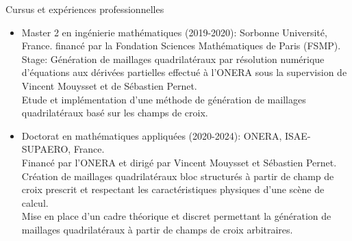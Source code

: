 \documentclass[compress,10pt,aspectratio=169]{beamer}
\begin{document}
\begin{frame}{Cursus et expériences professionnelles}
\small
\vspace{-0.2cm}
\begin{itemize}
\item {\color{onera} Master 2 en ingénierie mathématiques (2019-2020):} Sorbonne Université, France. financé par la Fondation Sciences Mathématiques de Paris (FSMP).\\
Stage: Génération de maillages quadrilatéraux par résolution numérique d’équations aux dérivées partielles effectué à l'ONERA sous la supervision de Vincent Mouysset et de Sébastien Pernet.\\
{\color{onera_gray} Etude et implémentation d'une méthode de génération de maillages quadrilatéraux basé sur les champs de croix.}\\\vspace{0.6cm}

\item {\color{onera} Doctorat en mathématiques appliquées (2020-2024):} ONERA, ISAE-SUPAERO, France.\\
Financé par l'ONERA et dirigé par Vincent Mouysset et Sébastien Pernet. \\
Création de maillages quadrilatéraux bloc structurés à partir de champ de croix prescrit et respectant les caractéristiques physiques d'une scène de calcul.\\
{\color{onera_gray} Mise en place d'un cadre théorique et discret permettant la génération de maillages quadrilatéraux à partir de champs de croix arbitraires.}\\\vspace{0.2cm}
\end{itemize}
\end{frame}
\end{document}
